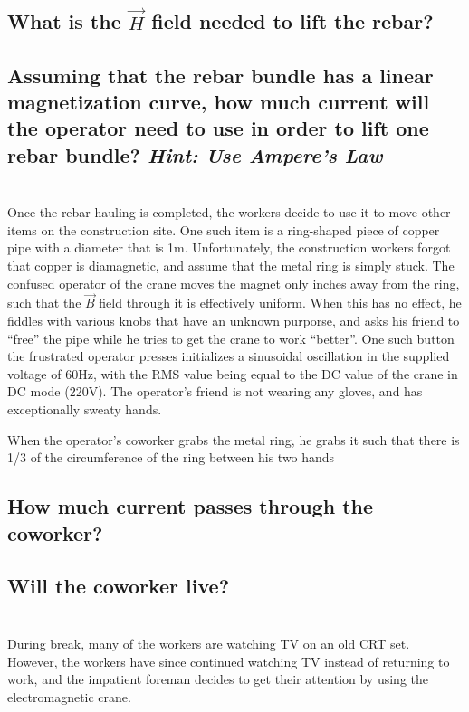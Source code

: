 \documentclass{./cls/hw}
\begin{document}
\subsection{What is the $\vec{H}$ field needed to lift the rebar?}
\subsection{Assuming that the rebar bundle has a linear magnetization curve,
  how much current will the operator need to use in order to lift one rebar
  bundle? \emph{Hint: Use Ampere's Law}}

\section{}
Once the rebar hauling is completed, the workers decide to use it to move
other items on the construction site. One such item is a ring-shaped piece of
copper pipe with a diameter that is 1m. Unfortunately, the construction
workers forgot that copper is diamagnetic, and assume that the metal ring is
simply stuck. The  confused operator of the crane moves the magnet only inches
away from the ring, such that the $\vec{B}$ field through it is effectively
uniform. When this has no effect, he fiddles with various knobs that have an unknown purporse, and asks his friend to ``free'' the pipe while he tries to get the crane to work
``better''. One such button  the frustrated operator presses initializes a
sinusoidal oscillation in the supplied voltage of 60Hz, with the RMS value
being equal to the DC value of the crane in DC mode (220V). The operator's
friend is not wearing any gloves, and has exceptionally sweaty hands.

When the operator's coworker grabs the metal ring, he grabs it such that there is 1/3 of the circumference of the ring between his two hands
\subsection{ How much current passes through the coworker?}
\subsection{ Will the coworker live?}

\section{}
During break, many of the workers are watching TV on an old CRT set.
However, the workers have since continued watching TV instead of returning to
work, and the impatient foreman decides to get their attention by using the
electromagnetic crane.
\end{document}
